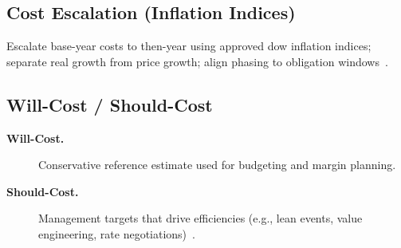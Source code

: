 \documentclass[../main.tex]{subfiles}
\begin{document}
\subsection{Cost Escalation (Inflation Indices)}
Escalate base-year costs to then-year using approved \ac{dow} inflation indices; separate real growth from price growth; align phasing to obligation windows~\autocite{DoDFMR-Vol3}.

\subsection{Will-Cost / Should-Cost}
\begin{description}
  \item[\textbf{Will-Cost.}] Conservative reference estimate used for budgeting and margin planning.
  \item[\textbf{Should-Cost.}] Management targets that drive efficiencies (e.g., lean events, value engineering, rate negotiations)~\autocite{DoDI5000-85}.
\end{description}

\end{document}
